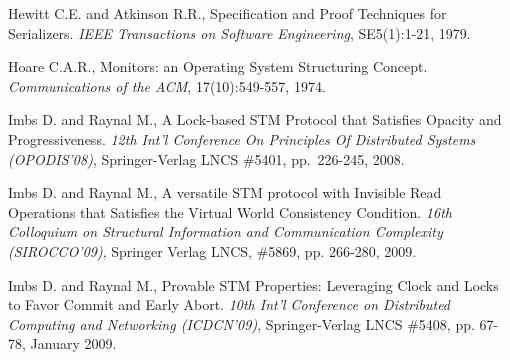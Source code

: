 \begin{thebibliography}{99}
{ 


Hewitt C.E. and Atkinson R.R., 
Specification and Proof Techniques for Serializers. 
{\it IEEE Transactions on Software Engineering}, SE5(1):1-21, 1979. 



Hoare C.A.R., 
Monitors: an Operating System Structuring Concept. 
{\it Communications of the  ACM}, 17(10):549-557, 1974. 




Imbs D. and Raynal M.,
A Lock-based STM Protocol  that Satisfies Opacity and Progressiveness. 
{\it 12th Int'l Conference On Principles Of Distributed Systems
(OPODIS'08)},   Springer-Verlag LNCS  \#5401, pp.~226-245, 2008. 


Imbs D. and Raynal M., 
A versatile   STM protocol with Invisible Read Operations
that Satisfies  the  Virtual World Consistency Condition.
{\it  16th  Colloquium   on  Structural   Information   and  Communication
Complexity  (SIROCCO'09)}, Springer Verlag LNCS,  \#5869,  pp. 266-280, 2009. 






Imbs D. and Raynal M.,
Provable STM Properties: Leveraging Clock and Locks to Favor Commit 
and Early Abort.
{\it 10th Int'l Conference on Distributed Computing and  Networking
(ICDCN'09)},  Springer-Verlag LNCS  \#5408, pp. 67-78, January 2009. 





}
\end{thebibliography}
